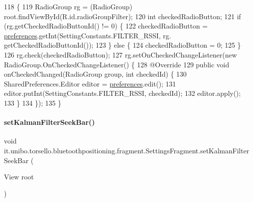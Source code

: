 \begin{DoxyCode}
118                                          \{
119         RadioGroup rg = (RadioGroup) root.findViewById(R.id.radioGroupFilter);
120         \textcolor{keywordtype}{int} checkedRadioButton;
121         \textcolor{keywordflow}{if} (rg.getCheckedRadioButtonId() != 0) \{
122             checkedRadioButton = \hyperlink{classit_1_1unibo_1_1torsello_1_1bluetoothpositioning_1_1fragment_1_1SettingsFragment_a52480c4d5d81ca59fe4a98ae3c623ea4_a52480c4d5d81ca59fe4a98ae3c623ea4}{preferences}.getInt(SettingConstants.FILTER\_RSSI, rg.
      getCheckedRadioButtonId());
123         \} \textcolor{keywordflow}{else} \{
124             checkedRadioButton = 0;
125         \}
126         rg.check(checkedRadioButton);
127         rg.setOnCheckedChangeListener(\textcolor{keyword}{new} RadioGroup.OnCheckedChangeListener() \{
128             @Override
129             \textcolor{keyword}{public} \textcolor{keywordtype}{void} onCheckedChanged(RadioGroup group, \textcolor{keywordtype}{int} checkedId) \{
130                 SharedPreferences.Editor editor = \hyperlink{classit_1_1unibo_1_1torsello_1_1bluetoothpositioning_1_1fragment_1_1SettingsFragment_a52480c4d5d81ca59fe4a98ae3c623ea4_a52480c4d5d81ca59fe4a98ae3c623ea4}{preferences}.edit();
131                 editor.putInt(SettingConstants.FILTER\_RSSI, checkedId);
132                 editor.apply();
133             \}
134         \});
135     \}
\end{DoxyCode}
\hypertarget{classit_1_1unibo_1_1torsello_1_1bluetoothpositioning_1_1fragment_1_1SettingsFragment_a84057f1633708ec85de5968ed9e7f032_a84057f1633708ec85de5968ed9e7f032}{}\label{classit_1_1unibo_1_1torsello_1_1bluetoothpositioning_1_1fragment_1_1SettingsFragment_a84057f1633708ec85de5968ed9e7f032_a84057f1633708ec85de5968ed9e7f032} 
\paragraph{\texorpdfstring{set\+Kalman\+Filter\+Seek\+Bar()}{setKalmanFilterSeekBar()}}
{\footnotesize\ttfamily void it.\+unibo.\+torsello.\+bluetoothpositioning.\+fragment.\+Settings\+Fragment.\+set\+Kalman\+Filter\+Seek\+Bar (\begin{DoxyParamCaption}\item[{View}]{root }\end{DoxyParamCaption})\hspace{0.3cm}{\ttfamily [private]}}


